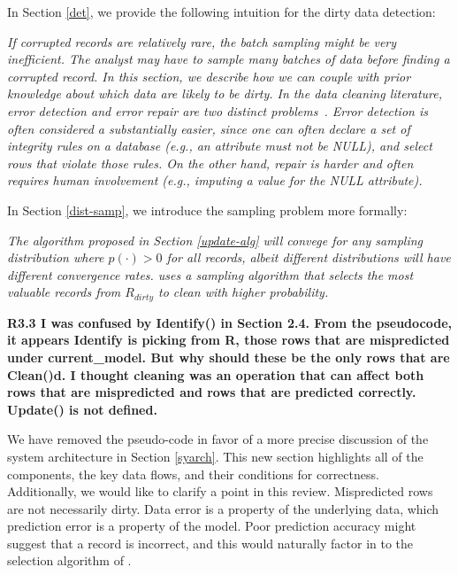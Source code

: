 \vspace{0.5em}

In Section \ref{det}, we provide the following intuition for the dirty data detection:

\emph{If corrupted records are relatively rare, the batch sampling might be very inefficient.
The analyst may have to sample many batches of data before finding a corrupted record.
In this section, we describe how we can couple \sys with prior knowledge about which data are likely to be dirty.
In the data cleaning literature, error detection and error repair are two distinct problems~\cite{DBLP:series/synthesis/2012Fan, Dasu:2003:EDM:861869, rahm2000data}.
Error detection is often considered a substantially easier, since one can often declare a set of integrity rules on a database (e.g., an attribute must not be NULL), and select rows that violate those rules.
On the other hand, repair is harder and often requires human involvement (e.g., imputing a value for the NULL attribute).}

\vspace{0.5em}

In Section \ref{dist-samp}, we introduce the sampling problem more formally:

\emph{The algorithm proposed in Section \ref{update-alg} will convege for 
any sampling distribution where  $p(\cdot) > 0$ for all records, albeit different distributions will have different convergence rates.
\sys uses a sampling algorithm that selects the most valuable records from $R_{dirty}$ to clean with higher probability.}

\vspace{0.5em}

\noindent \textbf{R3.3 I was confused by Identify() in Section 2.4.
From the pseudocode, it appears Identify is picking from R,
those rows that are mispredicted under current\_model.
But why should these be the only rows that are Clean()d.
I thought cleaning was an operation that can
affect both rows that are mispredicted and rows that
are predicted correctly. Update() is not defined.}

\noindent  We have removed the pseudo-code in favor of a more precise discussion of the system architecture in Section \ref{syarch}. This new section highlights all of the components, the key data flows, and their conditions for correctness. Additionally, we would like to clarify a point in this review. Mispredicted rows are not necessarily dirty. Data error is a property of the underlying data, which prediction error is a property of the model. Poor prediction accuracy might suggest that a record is incorrect, and this would naturally factor in to the selection algorithm of \sys.

